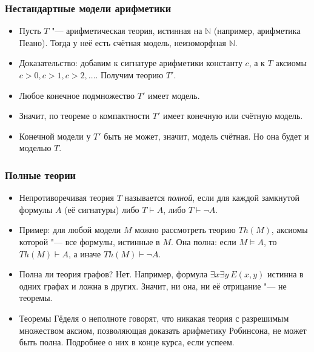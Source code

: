 \documentclass[10pt]{beamer}
\begin{document}
\begin{frame}
    \frametitle{Нестандартные модели арифметики}
    \begin{itemize}
        \item Пусть $T$ "--- арифметическая теория, истинная на $\mathbb{N}$ (например, арифметика Пеано). Тогда у неё есть счётная модель, неизоморфная $\mathbb{N}$.
        \item Доказательство: добавим к сигнатуре арифметики константу $c$, а к $T$ аксиомы $c > 0, c > 1, c > 2, \ldots$. Получим теорию $T'$. \pause 
        \item Любое конечное подмножество $T'$ имеет модель. 
        \item Значит, по теореме о компактности $T'$ имеет конечную или счётную модель. 
        \pause 
        \item Конечной модели у $T'$ быть не может, значит, модель счётная. Но она будет и моделью $T$.
    \end{itemize}
\end{frame}

\begin{frame}
    \frametitle{Полные теории}
    \begin{itemize}
        \item Непротиворечивая теория $T$ называется \emph{полной}, если для каждой замкнутой формулы $A$ (её сигнатуры) либо $T \vdash A$, либо $T \vdash \neg A$.
        \item Пример: для любой модели $M$ можно рассмотреть теорию $Th(M)$, аксиомы которой "--- все формулы, истинные в $M$. Она \pause полна: если $M \vDash A$, то $Th(M) \vdash A$, а иначе $Th(M) \vdash \neg A$.
        \item Полна ли теория графов? \pause Нет. Например, формула $\exists x \exists y ~ E(x,y)$ истинна в одних графах и ложна в других. Значит, ни она, ни её отрицание "--- не теоремы.
        \pause
        \item Теоремы Гёделя о неполноте говорят, что никакая теория с разрешимым множеством аксиом, позволяющая доказать арифметику Робинсона, не может быть полна. Подробнее о них в конце курса, если успеем.
    \end{itemize}
\end{frame}
\end{document}
